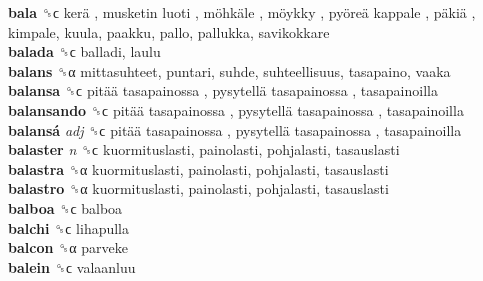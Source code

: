 \textbf{bala} ␝ϲ   kerä ,  musketin luoti ,  möhkäle ,  möykky ,  pyöreä kappale ,  päkiä , kimpale, kuula, paakku, pallo, pallukka, savikokkare  \\
\textbf{balada} ␝ϲ  balladi, laulu  \\
\textbf{balans} ␝α  mittasuhteet, puntari, suhde, suhteellisuus, tasapaino, vaaka  \\
\textbf{balansa} ␝ϲ   pitää tasapainossa ,  pysytellä tasapainossa , tasapainoilla  \\
\textbf{balansando} ␝ϲ   pitää tasapainossa ,  pysytellä tasapainossa , tasapainoilla  \\
\textbf{balansá} \emph{adj}  ␝ϲ   pitää tasapainossa ,  pysytellä tasapainossa , tasapainoilla  \\
\textbf{balaster} \emph{n}  ␝ϲ  kuormituslasti, painolasti, pohjalasti, tasauslasti  \\
\textbf{balastra} ␝α  kuormituslasti, painolasti, pohjalasti, tasauslasti  \\
\textbf{balastro} ␝α  kuormituslasti, painolasti, pohjalasti, tasauslasti  \\
\textbf{balboa} ␝ϲ  balboa  \\
\textbf{balchi} ␝ϲ  lihapulla  \\
\textbf{balcon} ␝α  parveke  \\
\textbf{balein} ␝ϲ  valaanluu  \\
